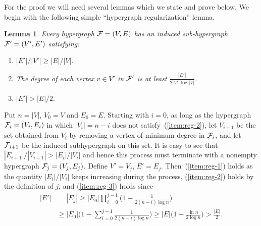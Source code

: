\documentclass[11pt]{article}
\makeatletter
\renewenvironment{proof}[1][\proofname]
{\par\pushQED{\qed}
	\normalfont\topsep6\p@\@plus6\p@\relax\trivlist
	\item[\hskip\labelsep\bfseries#1\@addpunct{.}]
	\ignorespaces}
{\popQED\endtrivlist\@endpefalse}
\newtheorem{lemma}[theo]{Lemma}
\newcommand{\FF}{{\cal F}}
\makeatother
\begin{document}
For the proof we will need several lemmas which we state and prove below.
We begin with the following simple ``hypergraph regularization'' lemma.
\begin{lemma}
	\label{l31}
	Every hypergraph $\FF=(V,E)$ has an induced sub-hypergraph $\FF'=(V',E')$ satisfying:
	\begin{enumerate}
		\item\label{item:reg-1}
		$|E'|/|V'| \geq |E|/|V|.$
		\item\label{item:reg-2}
		The degree of each vertex $v \in V'$ in $\FF'$ is at least
		$\frac{|E'|}{2|V'| \log|V|}$.
		\item\label{item:reg-3}
		$|E'| > |E|/2.$
	\end{enumerate}
\end{lemma}
\begin{proof} 
	Put $n=|V|$, $V_0=V$ and $E_0=E$. Starting with $i=0$, as long as the
	hypergraph $\FF_i=(V_i,E_i)$ in which $|V_i|=n-i$ does not satisfy~(\ref{item:reg-2}), let $V_{i+1}$ be the set obtained from $V_i$ by
	removing a vertex of minimum degree in $\FF_i$, and let $\FF_{i+1}$ be
	the induced subhypergraph on this set. 
	It is easy to see that $|E_{i+1}|/|V_{i+1}| > |E_i|/|V_i|$ and hence this process must terminate with a nonempty hypergraph $\FF_j=(V_j,E_j)$. Define $V'=V_j$, $E'=E_j$. Then~(\ref{item:reg-1}) holds as the quantity $|E_i|/|V_i|$ keeps increasing during the process, 
	(\ref{item:reg-2}) holds by the definition of $j$, and (\ref{item:reg-3}) holds since 
	\begin{align*}
	|E'| &= |E_j| \ge |E_0| \prod_{i=0}^{j-1} \Big(1-\frac{1}{2(n-i) \log n}\Big) \\
	&\geq |E_0| \Big(1-\sum_{i=0}^{j-1} \frac{1}{2(n-i) \log n}\Big)
	\geq |E|\Big(1-\frac{\ln n}{2\log n}\Big ) > \frac{|E|}{2}.
	\end{align*}
\end{proof}
\end{document}
